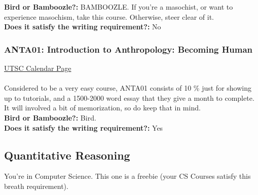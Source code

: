 \documentclass[11pt]{article}
\begin{document}
\textbf{Bird or Bamboozle?:} BAMBOOZLE.  If you're a masochist, or want to experience masochism, take this course.  Otherwise, steer clear of it.\\

\textbf{Does it satisfy the writing requirement?:} No

\subsubsection{ANTA01: Introduction to Anthropology: Becoming Human}
\href{https://utsc.calendar.utoronto.ca/course/ANTA01H3}{UTSC Calendar Page}\\\\
Considered to be a very easy course, ANTA01 consists of 10 \% just for showing up to tutorials, and a 1500-2000 word essay that they give  a month to complete.  It will involved a bit of memorization, so do keep that in mind.\\

\textbf{Bird or Bamboozle?:} Bird.\\

\textbf{Does it satisfy the writing requirement?:} Yes

\subsection{Quantitative Reasoning}
You're in Computer Science. This one is a freebie (your CS Courses satisfy this breath requirement).
\end{document}
